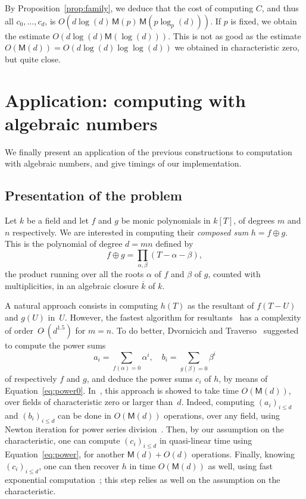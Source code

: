 \documentclass[amsthm]{elsart}
\def\M {\ensuremath{\mathsf{M}}}
\theoremstyle{plain}
\begin{document}
By Proposition~\ref{prop:family}, we deduce that the cost of computing
$C$, and thus all $c_0,\dots,c_d$, is $O( d\log(d)\, \M(p)\,
\M(p\log_p(d) )).$ If $p$ is fixed, we obtain the estimate $O(d
\log(d) \M(\log(d))).$ This is not as good as the estimate
$O(\M(d))=O(d \log(d) \log\log(d))$ we obtained in characteristic
zero, but quite close.




\section{Application: computing with algebraic numbers}\label{sec:algnum}

We finally present an application of the previous constructions to
computation with algebraic numbers, and give timings of our
implementation.



\subsection{Presentation of the problem}

Let $k$ be a field and let $f$ and $g$ be monic polynomials in $k[T]$,
of degrees $m$ and $n$ respectively. We are interested in computing
their {\it composed sum} $h=f\oplus g$. This is the polynomial of
degree $d=mn$ defined by $$ f\oplus g = \prod _{\alpha, \beta}
(T-\alpha-\beta),$$ the product running over all the roots $\alpha$ of
$f$ and $\beta$ of $g$, counted with multiplicities, in an algebraic
closure $\overline{k}$ of $k$.

A natural approach consists in computing $h(T)$ as the resultant of
$f(T-U)$ and $g(U)$ in~$U$. However, the fastest algorithm for
resultants~\cite{Reischert97} has a complexity of
order~$O\tilde{~}(d^{1.5})$ for $m=n$. To do better, Dvornicich and
Traverso~\cite{DvTr87} suggested to compute the power sums
$$a_i=\sum_{f(\alpha)=0} \alpha^i,\quad b_i=\sum_{g(\beta)=0} \beta^i$$ of
respectively $f$ and $g$, and deduce the power sums $c_i$ of $h$, by
means of Equation~\eqref{eq:power0}.
In~\cite{BoFlSaSc06}, this approach is showed to take time $O(\M(d))$,
over fields of characteristic zero or larger than~$d$.  Indeed,
computing $(a_i)_{i \le d}$ and $(b_i)_{i \le d}$ can be done in
$O(\M(d))$ operations, over any field, using Newton iteration for
power series division~\cite{Schonhage82}. Then, by our assumption on
the characteristic, one can compute $(c_i)_{i \le d}$ in quasi-linear
time using Equation~\eqref{eq:power}, for another $\M(d)+O(d)$
operations. Finally, knowing $(c_i)_{i \le d}$, one can then recover
$h$ in time $O(\M(d))$ as well, using fast exponential
computation~\cite{Brent75,Schonhage82,vdH:fnewton,BS:exp};
this step relies as well on the assumption on the characteristic.
\end{document}
